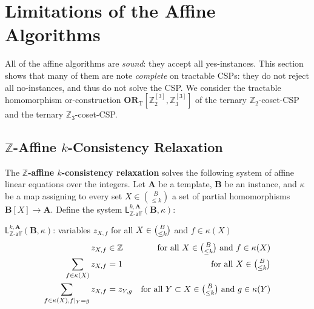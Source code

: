 \documentclass[a4paper,english, thm-restate]{lipics-v2021}
\newcommand{\ZZ}{\mathbb{Z}}
\newcommand{\defining}[1]{\textbf{#1}}
\newcommand{\StructA}{\mathbf{A}}
\newcommand{\StructB}{\mathbf{B}}
\newcommand{\restrict}[2]{#1|_{#2}}
\newcommand{\leqs}{\mathsf{L}}
\newcommand{\zafkleq}[4]{\leqs^{#1,#2}_{\ZZ\mathsf{\text{-}aff}}(#3,#4)}
\newcommand{\CosetGrpTmplt}[2]{#1^{[#2]}}
\newcommand{\ORT}[1]{\mathbf{OR}_\text{T}[#1]}
\begin{document}
	\section{Limitations of the Affine Algorithms}
	\label{sec:power-of-affine}
	All of the affine algorithms are \emph{sound}: they accept all yes-instances.
	This section shows that many of them are note \emph{complete} on tractable CSPs:  they do not reject all no-instances, and thus do not solve the CSP.
	We consider the tractable homomorphism or-construction $\ORT{\CosetGrpTmplt{\ZZ_2}{3}, \CosetGrpTmplt{\ZZ_3}{3}}$
	of the ternary $\ZZ_2$-coset-CSP and  the ternary $\ZZ_3$-coset-CSP.
	
	
	
	\subsection{\texorpdfstring{$\ZZ$}{ℤ}-Affine \texorpdfstring{$k$}{k}-Consistency Relaxation}
	\label{sec:zAffineConsistency}
	
	
	The \defining{$\ZZ$-affine $k$-consistency relaxation} \cite{DalmauOprsal2024}
	solves the following system of affine linear equations over the integers.
	Let $\StructA$ be a template, $\StructB$ be an instance,
	and $\kappa$ be a map
	assigning to every set  $X \in \binom{B}{\leq k}$ a set of partial homomorphisms $\StructB[X] \to \StructA$.
	Define the system $\zafkleq{k}{\StructA}{\StructB}{\kappa}$:
	
	\begin{systembox}{$\zafkleq{k}{\StructA}{\StructB}{\kappa}$: variables $z_{X,f}$
			for all $X \in {\tbinom{B} {\leq k}}$
			and $f \in \kappa(X)$}
		\begin{align*}
			z_{X,f} &\in \ZZ &  \text{for all } X \in \tbinom{B}{\leq k} \text { and } f \in \kappa(X)\\
			\sum_{f \in \kappa(X)}  z_{X,f}&= 1 &  \text{for all } X \in \tbinom{B}{\leq k}\\
			\sum_{f \in \kappa(X), \restrict{f}{Y} = g} z_{X,f} &= z_{Y,g} & \text{for all } Y\subset X \in \tbinom{B}{\leq k} \text { and } g \in \kappa(Y) 
		\end{align*}
	\end{systembox}
	
\end{document}
